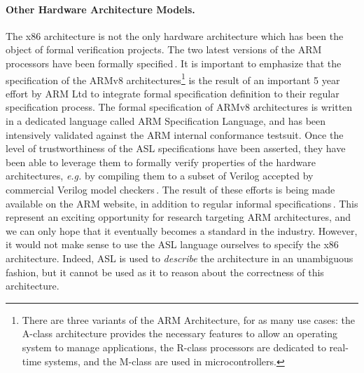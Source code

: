 \paragraph{Other Hardware Architecture Models.}
%
The x86 architecture is not the only hardware architecture which has been the
object of formal verification projects.
%
The two latest versions of the ARM processors have been formally
specified\,\cite{fox2010armv7,reid2016armv8}.
%
It is important to emphasize that the specification of the ARMv8
architectures\footnote{There are three variants of the ARM Architecture, for as
  many use cases: the A-class architecture provides the necessary features to
  allow an operating system to manage applications, the R-class processors are
  dedicated to real-time systems, and the M-class are used in microcontrollers.}
is the result of an important 5 year effort by ARM Ltd to integrate formal
specification definition to their regular specification process. 
%
The formal specification of ARMv8 architectures is written in a dedicated
language called ARM Specification Language, and has been intensively validated
against the ARM internal conformance testsuit.
%
Once the level of trustworthiness of the ASL specifications have been asserted,
they have been able to leverage them to formally verify properties of the
hardware architectures, \emph{e.g.} by compiling them to a subset of Verilog
accepted by commercial Verilog model checkers\,\cite{reid2016end}.
%
The result of these efforts is being made available on the ARM website, in
addition to regular informal specifications\,\cite{arm2018aspec}.
%
This represent an exciting opportunity for research targeting ARM architectures,
and we can only hope that it eventually becomes a standard in the industry.
%
However, it would not make sense to use the ASL language ourselves to specify
the x86 architecture. 
%
Indeed, ASL is used to \emph{describe} the architecture in an unambiguous
fashion, but it cannot be used as it to reason about the correctness of this
architecture. 

